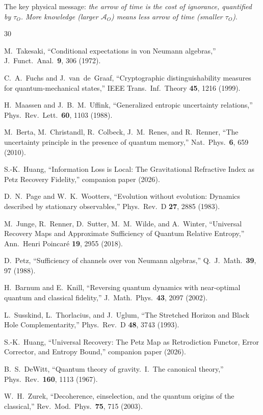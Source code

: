 \documentclass[aps,prd,preprint,superscriptaddress,longbibliography]{revtex4-2}
\newcommand{\tauasym}{\tau}
\newcommand{\algO}{\mathcal{A}}
\begin{document}
The key physical message: \emph{the arrow of time is the cost of
ignorance, quantified by $\tauasym_O$.  More knowledge (larger
$\algO_O$) means less arrow of time (smaller $\tauasym_O$)}.


\begin{thebibliography}{30}

M.~Takesaki,
``Conditional expectations in von Neumann algebras,''
J.\ Funct.\ Anal.\ \textbf{9}, 306 (1972).

C.~A.~Fuchs and J.~van~de~Graaf,
``Cryptographic distinguishability measures for quantum-mechanical
states,''
IEEE Trans.\ Inf.\ Theory \textbf{45}, 1216 (1999).

H.~Maassen and J.~B.~M.~Uffink,
``Generalized entropic uncertainty relations,''
Phys.\ Rev.\ Lett.\ \textbf{60}, 1103 (1988).

M.~Berta, M.~Christandl, R.~Colbeck, J.~M.~Renes, and R.~Renner,
``The uncertainty principle in the presence of quantum memory,''
Nat.\ Phys.\ \textbf{6}, 659 (2010).

S.-K.~Huang,
``Information Loss is Local: The Gravitational Refractive Index as
Petz Recovery Fidelity,'' companion paper (2026).

D.~N.~Page and W.~K.~Wootters,
``Evolution without evolution: Dynamics described by stationary
observables,''
Phys.\ Rev.\ D \textbf{27}, 2885 (1983).

M.~Junge, R.~Renner, D.~Sutter, M.~M.~Wilde, and A.~Winter,
``Universal Recovery Maps and Approximate Sufficiency of Quantum
Relative Entropy,''
Ann.\ Henri Poincar\'e \textbf{19}, 2955 (2018).

D.~Petz,
``Sufficiency of channels over von Neumann algebras,''
Q.\ J.\ Math.\ \textbf{39}, 97 (1988).

H.~Barnum and E.~Knill,
``Reversing quantum dynamics with near-optimal quantum and classical
fidelity,''
J.\ Math.\ Phys.\ \textbf{43}, 2097 (2002).

L.~Susskind, L.~Thorlacius, and J.~Uglum,
``The Stretched Horizon and Black Hole Complementarity,''
Phys.\ Rev.\ D \textbf{48}, 3743 (1993).

S.-K.~Huang,
``Universal Recovery: The Petz Map as Retrodiction Functor,
Error Corrector, and Entropy Bound,''
companion paper (2026).

B.~S.~DeWitt,
``Quantum theory of gravity.\ I.\ The canonical theory,''
Phys.\ Rev.\ \textbf{160}, 1113 (1967).

W.~H.~Zurek,
``Decoherence, einselection, and the quantum origins of the
classical,''
Rev.\ Mod.\ Phys.\ \textbf{75}, 715 (2003).

\end{thebibliography}
\end{document}
